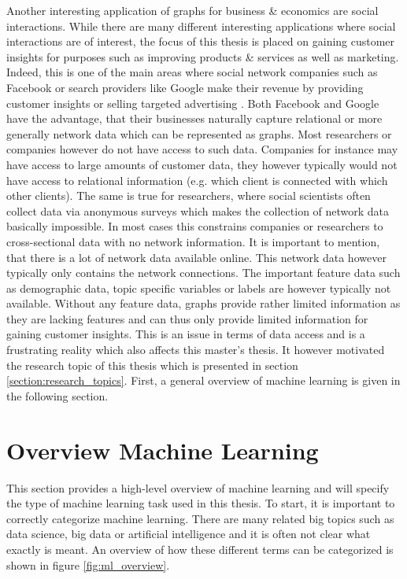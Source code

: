 	\noindent Another interesting application of graphs for business \& 
	economics are social interactions. While there are many different
	interesting applications where social interactions are of interest,
	the focus of this thesis is placed on gaining customer insights for 
	purposes such as improving products \& services as well as marketing. Indeed, 
	this is one of the main areas where social network companies such as 
	Facebook or search providers like Google make their revenue by providing 
	customer insights or selling targeted advertising 
	\citep{Facebook2021,Alphabet2021}. Both Facebook and Google have the 
	advantage, that their businesses naturally capture relational or more 
	generally network data which can be represented as graphs. Most researchers 
	or companies however do not have access to such data. Companies for instance 
	may have access to large amounts of customer data, they however typically 
	would not have access to relational information (e.g. which client is 
	connected with which other clients). The same is true for researchers, where 
	social scientists often collect data via anonymous surveys which makes the 
	collection of network data basically impossible. In most cases this 
	constrains companies or researchers to cross-sectional data with no network 
	information. It is important to mention, that there is a lot of network 
	data available online. This network data however typically only contains the 
	network connections. The important feature data such as demographic data, 
	topic specific variables or labels are however typically not available. 
	Without any feature data, graphs provide rather limited information as they 
	are lacking features and can thus only provide limited information for 
	gaining customer insights. This is an issue in terms of data access and is 
	a frustrating reality which also affects this master's thesis. It however 
	motivated the research topic of this thesis which is presented in section
	\ref{section:research_topics}. First, a general overview of machine
	learning is given in the following section.
	
	\section{Overview Machine Learning}

	This section provides a high-level overview of machine learning and
	will specify the type of machine learning task used in this thesis. To
	start, it is important to correctly categorize machine learning. There are
	many related big topics such as data science, big data or artificial
	intelligence and it is often not clear what exactly is meant. An overview
	of how these different terms can be categorized is shown in figure 
	\ref{fig:ml_overview}.

